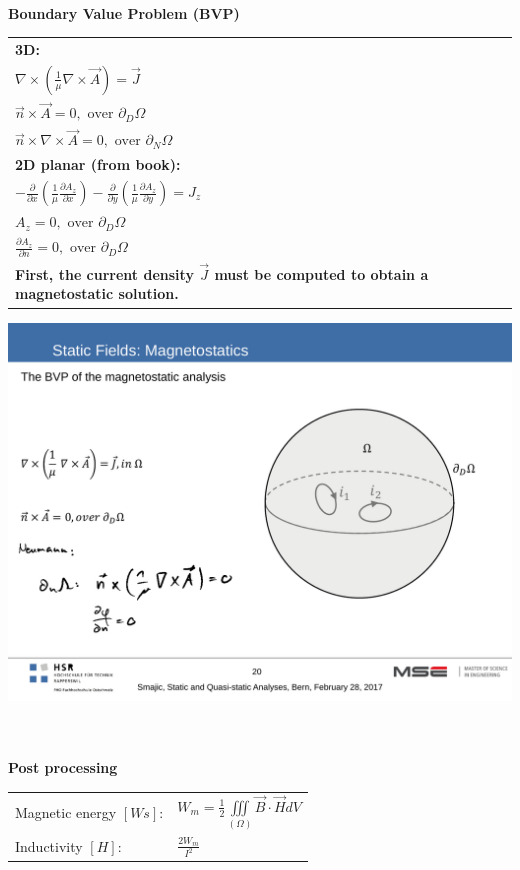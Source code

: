 \textbf{\\ Boundary Value Problem (BVP)\\}
\begin{minipage}[lt]{11cm}
	\begin{tabular}{l}
		\textbf{3D:} \\
		\(\displaystyle \nabla \times \left(\frac{1}{\mu}\nabla \times \vec{A}\right) = \vec{J} \) \\
		\(\displaystyle \vec{n} \times \vec{A} = 0, \textrm{ over } \partial_D\Omega \) \\
		\(\displaystyle \vec{n} \times \nabla \times \vec{A} = 0,\textrm{ over } \partial_N\Omega \) \\
		\textbf{2D planar (from book):} \\
		\(\displaystyle -\frac{\partial }{\partial x} \left(\frac{1}{\mu} \frac{\partial A_z}{\partial x}\right) - \frac{\partial }{\partial y} \left(\frac{1}{\mu} \frac{\partial A_z}{\partial y}\right) = J_z \) \\
		\(\displaystyle A_z = 0, \textrm{ over } \partial_D\Omega \) \\
		\(\displaystyle \frac{\partial A_z}{\partial n} = 0, \textrm{ over } \partial_D\Omega\) \\
		\textbf{First, the current density $\vec{J}$ must be computed to obtain a magnetostatic solution.}
	\end{tabular}
\end{minipage}
\begin{minipage}[rt]{8cm}
	\includegraphics[width=.8\textwidth]{./images/BVP_magnetostatic.pdf}
\end{minipage}

\textbf{\\ \\ Post processing \\ }
\begin{tabular}{ll}
	Magnetic energy $\left[Ws\right]$: & \(\displaystyle W_m = \frac{1}{2} \iiint\limits_{\left(\Omega\right)} \vec{B} \cdot \vec{H} dV \) \\
	Inductivity $\left[H\right]$: & \(\displaystyle \frac{2 W_m}{I^2} \) 
\end{tabular}